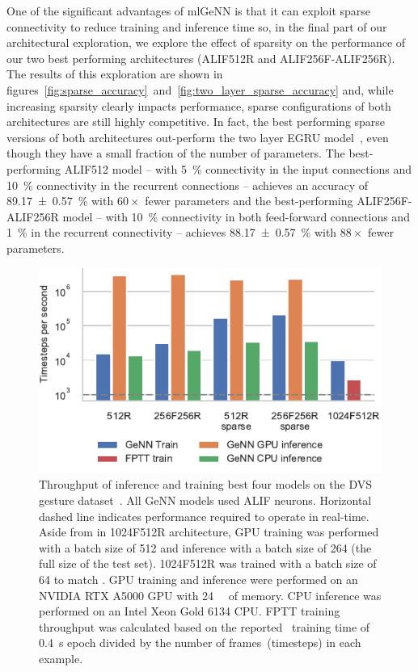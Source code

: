 \documentclass[sigconf]{acmart}
\begin{document}
One of the significant advantages of mlGeNN is that it can exploit sparse connectivity to reduce training and inference time so, in the final part of our architectural exploration, we explore the effect of sparsity on the performance of our two best performing architectures (ALIF512R and ALIF256F-ALIF256R).
The results of this exploration are shown in figures~\ref{fig:sparse_accuracy}~and~\ref{fig:two_layer_sparse_accuracy} and, while increasing sparsity clearly impacts performance, sparse configurations of both architectures are still highly competitive.
In fact, the best performing sparse versions of both architectures out-perform the two layer EGRU model~\citep{subramoney2022egru}, even though they have a small fraction of the number of parameters.
The best-performing ALIF512 model -- with \SI{5}{\percent} connectivity in the input connections and \SI{10}{\percent} connectivity in the recurrent connections -- achieves an accuracy of \SI{89.17 \pm 0.57}{\percent} with $60\times$ fewer parameters and the best-performing ALIF256F-ALIF256R model -- with \SI{10}{\percent} connectivity in both feed-forward connections and \SI{1}{\percent} in the recurrent connectivity -- achieves \SI{88.17 \pm 0.57}{\percent} with $88\times$ fewer parameters.

\begin{figure}[t]
  \centering
  \includegraphics{figures/performance.pdf}
  \caption{Throughput of inference and training best four models on the DVS gesture dataset~\citep{amir_low_2017}.
  All GeNN models used ALIF neurons.
  Horizontal dashed line indicates performance required to operate in real-time.
  Aside from in 1024F512R architecture, GPU training was performed with a batch size of 512 and inference with a batch size of 264 (the full size of the test set).
  1024F512R was trained with a batch size of \num{64} to match \citet{yin2021accurate}.
  GPU training and inference were performed on an NVIDIA RTX A5000 GPU with \SI{24}{\giga\byte} of memory.
  CPU inference was performed on an Intel Xeon Gold 6134 CPU.
  FPTT training throughput was calculated based on the reported~\citep{yin2021accurate} training time of \SI{0.4}{\second} epoch divided by the number of frames~(timesteps) in each example.}
  \label{fig:performance}
\end{figure}
\end{document}
